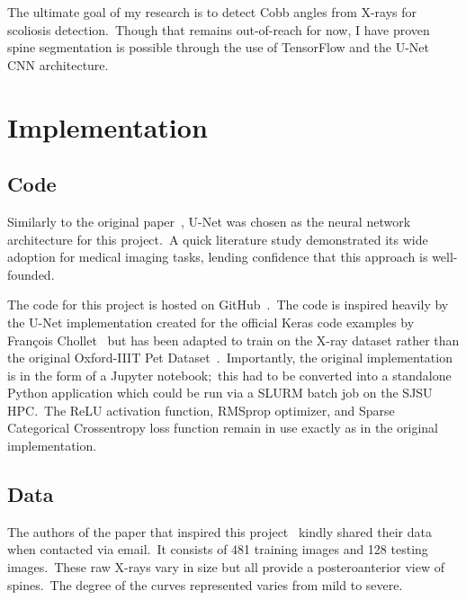 \documentclass[conference]{IEEEtran}
\begin{document}
    The ultimate goal of my research is to detect Cobb angles from X-rays for scoliosis detection.\ Though that remains out-of-reach for now, I have proven spine segmentation is possible through the use of TensorFlow and the U-Net CNN architecture.

    \section{Implementation}\label{sec:implementation}

    \subsection{Code}\label{subsec:code}

    Similarly to the original paper~\cite{cobb-angle-measurement-of-spine-from-x-ray-images-using-convolutional-neural-network}, U-Net was chosen as the neural network architecture for this project.\ A quick literature study demonstrated its wide adoption for medical imaging tasks, lending confidence that this approach is well-founded.

    The code for this project is hosted on GitHub~\cite{spine-segmentation}.\ The code is inspired heavily by the U-Net implementation created for the official Keras code examples by François Chollet~\cite{image-segmentation-with-a-u-net-like-architecture} but has been adapted to train on the X-ray dataset rather than the original Oxford-IIIT Pet Dataset~\cite{pets-dataset}.\ Importantly, the original implementation is in the form of a Jupyter notebook;\ this had to be converted into a standalone Python application which could be run via a SLURM batch job on the SJSU HPC\@.\ The ReLU activation function, RMSprop optimizer, and Sparse Categorical Crossentropy loss function remain in use exactly as in the original implementation.

    \subsection{Data}\label{subsec:data}

    The authors of the paper that inspired this project~\cite{cobb-angle-measurement-of-spine-from-x-ray-images-using-convolutional-neural-network} kindly shared their data when contacted via email.\ It consists of 481 training images and 128 testing images.\ These raw X-rays vary in size but all provide a posteroanterior view of spines.\ The degree of the curves represented varies from mild to severe.
\end{document}
